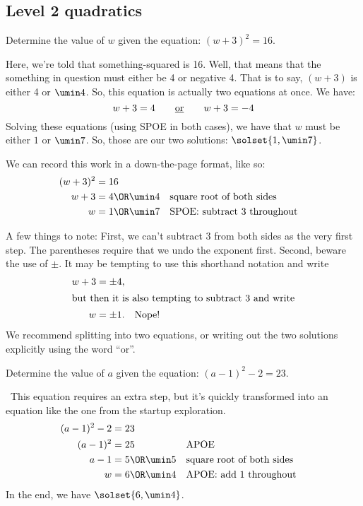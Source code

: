 \subsection{Level 2 quadratics}

\begin{boxedexplore}
Determine the value of $w$ given the equation: $(w+3)^2 = 16$.
\end{boxedexplore} %

Here, we're told that something-squared is 16. Well, that means that the something in question must either be 4 or negative 4. That is to say, $(w+3)$ is either 4 or $\umin4$. So, this equation is actually two equations at once. We have:
\[w+3 = 4 \qquad\text{\underline{or}}\qquad w+3 = -4\]
Solving these equations (using SPOE in both cases), we have that $w$ must be either $1$ or $\umin7$. So, those are our two solutions: $\solset{1,\umin7}$.

We can record this work in a down-the-page format, like so:
\begin{align*}
(w+3)^2 &= 16
\\
w+3 &= 4 \OR \umin4
&&\text{square root of both sides}
\\
w &= 1 \OR \umin7
&&\text{SPOE: subtract 3 throughout}
\end{align*}

A few things to note: First, we can't subtract 3 from both sides as the very first step. The parentheses require that we undo the exponent first. Second, beware the use of $\pm$. It may be tempting to use this shorthand notation and write
\begin{align*}
w+3 &= \pm4,\\
\intertext{but then it is also tempting to subtract 3 and write}
w &= \pm1. \quad\text{Nope!}
\end{align*}
We recommend splitting into two equations, or writing out the two solutions explicitly using the word ``or''.

\begin{boxedex}
Determine the value of $a$ given the equation: $(a-1)^2 - 2 = 23$.

\exsoln\ This equation requires an extra step, but it's quickly transformed into an equation like the one from the startup exploration.
\begin{align*}
(a-1)^2 - 2 &= 23
\\
(a-1)^2 &= 25
&&\text{APOE}
\\
a-1 &= 5 \OR \umin5
&&\text{square root of both sides}
\\
w &= 6 \OR \umin4
&&\text{APOE: add 1 throughout}
\end{align*}
In the end, we have $\solset{6, \umin4}$.
\end{boxedex}

